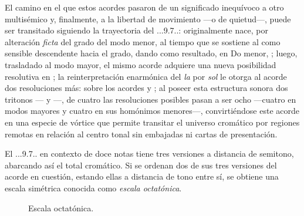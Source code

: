 \documentclass[a4paper,10pt]{article}
\begin{document}
\begin{multicols}{2}
El camino en el que estos acordes pasaron de un significado inequívoco a otro multisémico y, finalmente, a la libertad de movimiento ---o de quietud---, puede ser transitado siguiendo la trayectoria del \acorde.\Dohne..9\bemoltxt.7..: originalmente nace, por alteración \emph{ficta} del  grado del modo menor, al tiempo que se sostiene al  como sensible descendente hacia el  grado, dando como resultado, en Do menor, \hbox{;} luego, trasladado al modo mayor, el mismo acorde adquiere una nueva posibilidad resolutiva en \hbox{;} la reinterpretación enarmónica del \emph{la\bemoltxt} por \emph{sol\sostenidotxt} le otorga al acorde dos resoluciones más: sobre los acordes  y \hbox{;} al poseer esta estructura sonora dos tritonos --- y \hbox{---,} de cuatro las resoluciones posibles pasan a ser ocho ---cuatro en modos mayores y cuatro en sus homónimos menores---, convirtiéndose este acorde en una especie de vórtice que permite transitar el universo cromático por regiones remotas en relación al centro tonal sin embajadas ni cartas de presentación.

El \acorde.\Dohne..9\bemoltxt.7.. en contexto de doce notas tiene tres versiones a distancia de semitono, abarcando así el total cromático. Si se ordenan dos de sus tres versiones del acorde en cuestión, estando ellas a distancia de tono entre sí, se obtiene una escala simétrica conocida como \emph{escala octatónica}.
\end{multicols}

\begin{figure}[ht]
\centering
{}
\caption{Escala octatónica.}\label{fig:escala-octatonica}
\end{figure}
\end{document}
